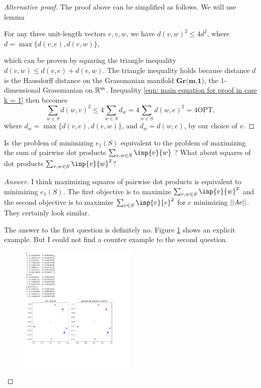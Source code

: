 \documentclass{article}
\begin{document}
\begin{proof}[Alternative proof]
The proof above can be simplified as follows. We will use lemma
\begin{lemma}
For any three unit-length vectors $e,v,w$, we have $d(v,w)^2\leq 4d^2$, where $d = \max\{d(v,e),d(e,w)\}$,
\end{lemma}
which can be proven by squaring the triangle inequality $d(v,w)\leq d(v,e)+d(e,w)$. The triangle inequality holds because distance $d$ is the Hausdorff distance on the Grassmanian manifold $\textbf{Gr(m,1)}$, the $1$-dimensional Grassmanian on $\mathbb{R}^m$. Inequality \ref{eqn: main equation for proof in case k = 1} then becomes 
\begin{equation}
    \sum_{w\in S}d(w,v)^2\leq 4\sum_{w\in S}d_w = 4\sum_{w\in S}d(w,e)^2 = 4\text{OPT},
\end{equation}
where $d_w = \max\{d(v,e),d(e,w)\}$, and $d_w = d(w,e)$, by our choice of $v$.
\end{proof}

\begin{question}
    Is the problem of minimizing $e_1(S)$ equivalent to the problem of maximizing the sum of pairwise dot products $\sum_{v,w\in S}\inp{v}{w}$ ? What about squares of dot products $\sum_{v,w\in S}\inp{v}{w}^2$?
\end{question}

\begin{proof}[Answer]\label{Q: pairwise inner products and rank-1 approximation}
I think maximizing squares of pairwise dot products is equivalent to minimizing $e_1(S)$. The first objective is to maximize $\sum_{v,w\in S}\inp{v}{w}^2$ and the second objective is to maximize $\sum_{v\in S}\inp{v}{e}^2$ for $e$ minimizing $||Ae||$. They certainly look similar.

The answer to the first question is definitely no. Figure \ref{fig: not equivalent} shows an explicit example. But I could not find a counter example to the second question.
\begin{figure}
 \flushright
 \caption{\label{fig: not equivalent}}
 \includegraphics[width=0.5\textwidth]{images/not_equivalent.png}
\end{figure}
\end{proof}
\end{document}
